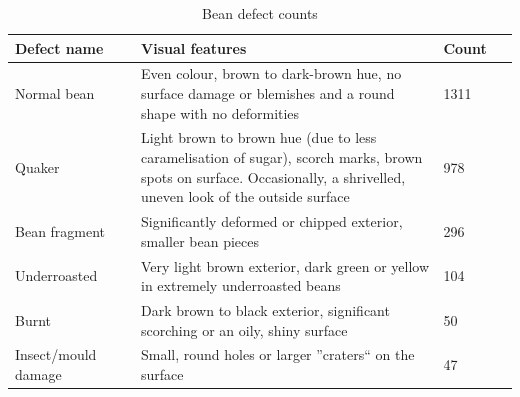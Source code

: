 \begin{table}[h]
	\centering
	\begin{tabular}{|p{0.25\linewidth}|p{0.6\linewidth}|p{0.15\linewidth}|}
		\toprule \textbf{Defect name} & \textbf{Visual features}                                                                                                                                             & \textbf{Count} \\
		\midrule Normal bean          & Even colour, brown to dark-brown hue, no surface damage or blemishes and a round shape with no deformities                                                           & 1311           \\
		Quaker                        & Light brown to brown hue (due to less caramelisation of sugar), scorch marks, brown spots on surface. Occasionally, a shrivelled, uneven look of the outside surface & 978            \\
		Bean fragment                 & Significantly deformed or chipped exterior, smaller bean pieces                                                                                                      & 296            \\
		Underroasted                  & Very light brown exterior, dark green or yellow in extremely underroasted beans                                                                                      & 104            \\
		Burnt                         & Dark brown to black exterior, significant scorching or an oily, shiny surface                                                                                        & 50             \\
		Insect/mould damage           & Small, round holes or larger ''craters`` on the surface                                                                                                              & 47             \\
		\bottomrule
	\end{tabular}
	\caption{Bean defect counts}
	\label{tab:beanDefectCounts}
\end{table}

